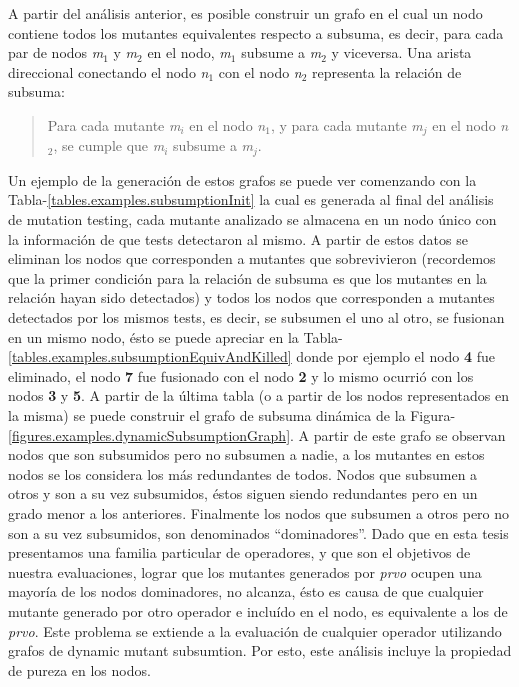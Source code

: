 A partir del an\'alisis anterior, es posible construir un grafo en el cual un nodo contiene todos los mutantes equivalentes respecto a subsuma, es decir, para cada par de nodos \emph{m$_1$} y \emph{m$_2$} en el nodo, \emph{m$_1$} subsume a \emph{m$_2$} y viceversa. Una arista direccional conectando el nodo \emph{n$_1$} con el nodo \emph{n$_2$} representa la relaci\'on de subsuma:
\begin{quote}
	Para cada mutante \emph{m$_i$} en el nodo \emph{n$_1$}, y para cada mutante \emph{m$_j$} en el nodo \emph{n$_2$}, se cumple que \emph{m$_i$} subsume a \emph{m$_j$}.
\end{quote}
Un ejemplo de la generaci\'on de estos grafos se puede ver comenzando con la Tabla-\ref{tables.examples.subsumptionInit} la cual es generada al final del an\'alisis de mutation testing, cada mutante analizado se almacena en un nodo \'unico con la informaci\'on de que tests detectaron al mismo. A partir de estos datos se eliminan los nodos que corresponden a mutantes que sobrevivieron (recordemos que la primer condici\'on para la relaci\'on de subsuma es que los mutantes en la relaci\'on hayan sido detectados) y todos los nodos que corresponden a mutantes detectados por los mismos tests, es decir, se subsumen el uno al otro, se fusionan en un mismo nodo, \'esto se puede apreciar en la Tabla-\ref{tables.examples.subsumptionEquivAndKilled} donde por ejemplo el nodo \textbf{4} fue eliminado, el nodo \textbf{7} fue fusionado con el nodo \textbf{2} y lo mismo ocurri\'o con los nodos \textbf{3} y \textbf{5}. A partir de la \'ultima tabla (o a partir de los nodos representados en la misma) se puede construir el grafo de subsuma din\'amica de la Figura-\ref{figures.examples.dynamicSubsumptionGraph}.
A partir de este grafo se observan nodos que son subsumidos pero no subsumen a nadie, a los mutantes en estos nodos se los considera los m\'as redundantes de todos. Nodos que subsumen a otros y son a su vez subsumidos, \'estos siguen siendo redundantes pero en un grado menor a los anteriores. Finalmente los nodos que subsumen a otros pero no son a su vez subsumidos, son denominados ``dominadores''. Dado que en esta tesis presentamos una familia particular de operadores, y que son el objetivos de nuestra evaluaciones, lograr que los mutantes generados por \emph{prvo} ocupen una mayor\'ia de los nodos dominadores, no alcanza, \'esto es causa de que cualquier mutante generado por otro operador e inclu\'ido en el nodo, es equivalente a los de \emph{prvo}. Este problema se extiende a la evaluaci\'on de cualquier operador utilizando grafos de dynamic mutant subsumtion. Por esto, este an\'alisis incluye la propiedad de pureza en los nodos.
